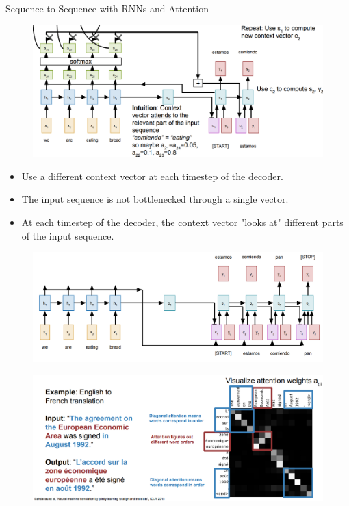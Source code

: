 \begin{frame}[allowframebreaks]{Sequence-to-Sequence with RNNs and Attention}
\begin{figure}
    \centering
    \includegraphics[width=1.0\textwidth,height=1.0\textheight,keepaspectratio]{images/advanced-cv/attention_7.png}
    \end{figure}  
\framebreak
    \begin{itemize}
        \item Use a different context vector at each timestep of the decoder.
        \item The input sequence is not bottlenecked through a single vector.
        \item At each timestep of the decoder, the context vector "looks at" different parts of the input sequence.
    \end{itemize}
    \begin{figure}
    \centering
    \includegraphics[width=1.0\textwidth,height=0.6\textheight,keepaspectratio]{images/advanced-cv/attention_8.png}
    \end{figure}  
\framebreak
    \begin{figure}
    \centering
    \includegraphics[width=1.05\textwidth,height=1.0\textheight,keepaspectratio]{images/advanced-cv/attention_9.png}
    \end{figure} 
\end{frame}